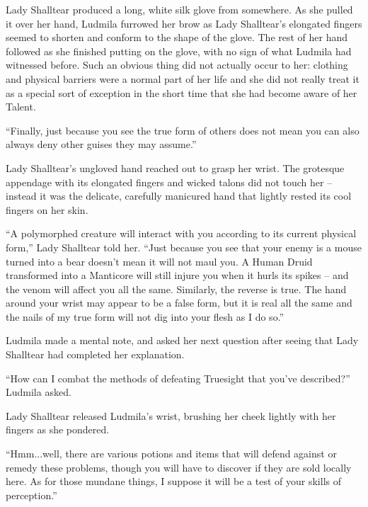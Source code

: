  

Lady Shalltear produced a long, white silk glove from somewhere. As she pulled it over her hand, Ludmila furrowed her brow as Lady Shalltear's elongated fingers seemed to shorten and conform to the shape of the glove. The rest of her hand followed as she finished putting on the glove, with no sign of what Ludmila had witnessed before. Such an obvious thing did not actually occur to her: clothing and physical barriers were a normal part of her life and she did not really treat it as a special sort of exception in the short time that she had become aware of her Talent.

 

“Finally, just because you see the true form of others does not mean you can also always deny other guises they may assume.”

 

Lady Shalltear’s ungloved hand reached out to grasp her wrist. The grotesque appendage with its elongated fingers and wicked talons did not touch her – instead it was the delicate, carefully manicured hand that lightly rested its cool fingers on her skin.

 

“A polymorphed creature will interact with you according to its current physical form,” Lady Shalltear told her. “Just because you see that your enemy is a mouse turned into a bear doesn't mean it will not maul you. A Human Druid transformed into a Manticore will still injure you when it hurls its spikes – and the venom will affect you all the same. Similarly, the reverse is true. The hand around your wrist may appear to be a false form, but it is real all the same and the nails of my true form will not dig into your flesh as I do so.”

 

Ludmila made a mental note, and asked her next question after seeing that Lady Shalltear had completed her explanation.

 

“How can I combat the methods of defeating Truesight that you’ve described?” Ludmila asked.

 

Lady Shalltear released Ludmila’s wrist, brushing her cheek lightly with her fingers as she pondered.

 

“Hmm...well, there are various potions and items that will defend against or remedy these problems, though you will have to discover if they are sold locally here. As for those mundane things, I suppose it will be a test of your skills of perception.”

